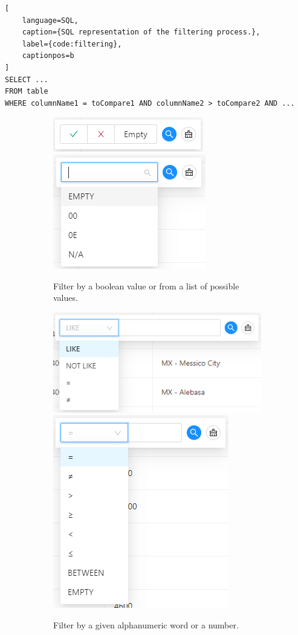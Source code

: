 \begin{lstlisting}[
    language=SQL, 
    caption={SQL representation of the filtering process.}, 
    label={code:filtering},
    captionpos=b
]
SELECT ...
FROM table
WHERE columnName1 = toCompare1 AND columnName2 > toCompare2 AND ...
\end{lstlisting}

\begin{figure}[!htb]

  \begin{subfigure}{\linewidth}
    \centering
    \includegraphics[width=.3\linewidth]{chapters/images/ch_3/FE/Common/boolean.png}
    \includegraphics[width=.3\linewidth]{chapters/images/ch_3/FE/Common/list.png}
    \caption{Filter by a boolean value or from a list of possible values.}
  \end{subfigure}\par\medskip
  \begin{subfigure}{\linewidth}
    \centering
    \includegraphics[width=.3\linewidth]{chapters/images/ch_3/FE/Common/string.png}
    \includegraphics[width=.3\linewidth]{chapters/images/ch_3/FE/Common/numeric.png}
    \caption{Filter by a given alphanumeric word or a number.}
  \end{subfigure}\par\medskip
  \begin{subfigure}{\linewidth}

\end{subfigure}
\end{figure}
